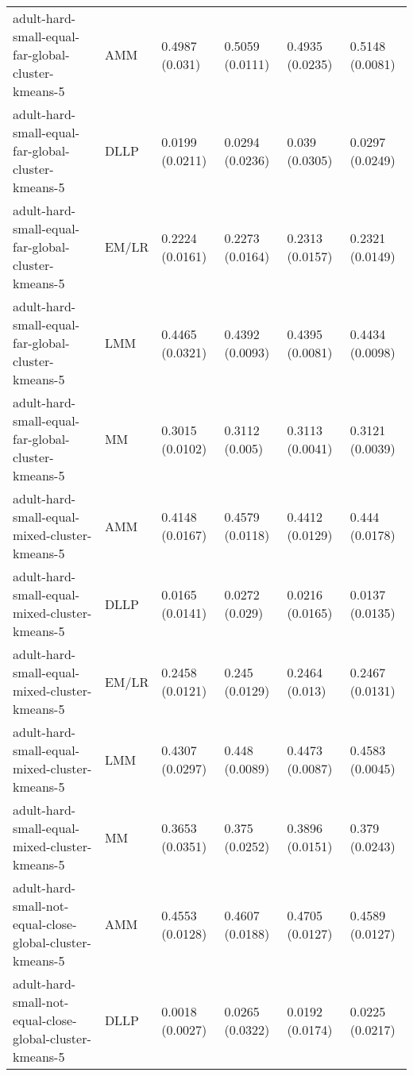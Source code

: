 \begin{tabular}{llllll}
                                     adult-hard-small-equal-far-global-cluster-kmeans-5 &       AMM &  0.4987 (0.031) &  0.5059 (0.0111) &   0.4935 (0.0235) &     0.5148 (0.0081) \\
                                     adult-hard-small-equal-far-global-cluster-kmeans-5 &      DLLP & 0.0199 (0.0211) &  0.0294 (0.0236) &    0.039 (0.0305) &     0.0297 (0.0249) \\
                                     adult-hard-small-equal-far-global-cluster-kmeans-5 &     EM/LR & 0.2224 (0.0161) &  0.2273 (0.0164) &   0.2313 (0.0157) &     0.2321 (0.0149) \\
                                     adult-hard-small-equal-far-global-cluster-kmeans-5 &       LMM & 0.4465 (0.0321) &  0.4392 (0.0093) &   0.4395 (0.0081) &     0.4434 (0.0098) \\
                                     adult-hard-small-equal-far-global-cluster-kmeans-5 &        MM & 0.3015 (0.0102) &   0.3112 (0.005) &   0.3113 (0.0041) &     0.3121 (0.0039) \\
                                          adult-hard-small-equal-mixed-cluster-kmeans-5 &       AMM & 0.4148 (0.0167) &  0.4579 (0.0118) &   0.4412 (0.0129) &      0.444 (0.0178) \\
                                          adult-hard-small-equal-mixed-cluster-kmeans-5 &      DLLP & 0.0165 (0.0141) &   0.0272 (0.029) &   0.0216 (0.0165) &     0.0137 (0.0135) \\
                                          adult-hard-small-equal-mixed-cluster-kmeans-5 &     EM/LR & 0.2458 (0.0121) &   0.245 (0.0129) &    0.2464 (0.013) &     0.2467 (0.0131) \\
                                          adult-hard-small-equal-mixed-cluster-kmeans-5 &       LMM & 0.4307 (0.0297) &   0.448 (0.0089) &   0.4473 (0.0087) &     0.4583 (0.0045) \\
                                          adult-hard-small-equal-mixed-cluster-kmeans-5 &        MM & 0.3653 (0.0351) &   0.375 (0.0252) &   0.3896 (0.0151) &      0.379 (0.0243) \\
                               adult-hard-small-not-equal-close-global-cluster-kmeans-5 &       AMM & 0.4553 (0.0128) &  0.4607 (0.0188) &   0.4705 (0.0127) &     0.4589 (0.0127) \\
                               adult-hard-small-not-equal-close-global-cluster-kmeans-5 &      DLLP & 0.0018 (0.0027) &  0.0265 (0.0322) &   0.0192 (0.0174) &     0.0225 (0.0217) \\

\end{tabular}
